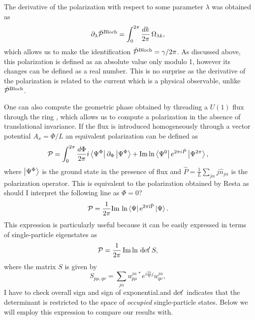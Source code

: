 \documentclass[twocolumn,amsmath,longbibliography,amssymb,superscriptaddress]{revtex4-1}
\newcommand{\carlos}[1]{{\color{red} #1}}
\newcommand{\maria}[1]{{\color{blue} #1}}
\begin{document}
The derivative of the polarization with respect to some parameter $\lambda$ was obtained \cite{KingSmith1993} as
\begin{equation}\label{eq:Bloch_polarization}
\partial_\lambda \tilde{\mathcal{P}}^{\rm Bloch} = \int_{0}^{2\pi} \frac{dk}{2\pi} \, \Omega_{\lambda k},
\end{equation}
which allows us to make the identification $ \tilde{\mathcal{P}}^{\rm Bloch} = \gamma/2\pi$. As discussed above,  this polarization is defined as an absolute value only modulo 1, however its changes can be defined as a real number. This is no surprise as the derivative of the polarization is related to the current which is a physical observable, unlike $\tilde{\mathcal{P}}^{\rm Bloch}$. 

One can also compute the geometric phase obtained by threading a $U(1)$ flux through the ring \cite{Watanabe2018}, which allows us to compute a polarization in the absence of translational invariance. If the flux is introduced homogeneously through a vector potential $A_x = \Phi/L$ an equivalent polarization can be defined as
\begin{equation}
\mathcal{P} = \int_0^{2\pi}\frac{d\Phi}{2\pi} i\bra{\Psi^\Phi}\partial_\Phi \ket{\Psi^\Phi} + \Im\ln \bra{\Psi^0}e^{2\pi i \hat{P}} \ket{\Psi^{2\pi}}, 
\end{equation}
where $\ket{\Psi^{\Phi}}$ is the ground state in the presence of flux and $\hat{P}=\frac{1}{L}\sum_{j\alpha} j\hat{n}_{j\alpha}$ is the polarization operator. This is equivalent to the polarization obtained by Resta \cite{Resta1997} as
\maria{should I interpret the following line as $\Phi=0$?}
\begin{align}
\mathcal{P} = \frac{1}{2\pi} \rm{ Im }\,\ln\bra{\Psi}e^{2\pi i \hat{P}}\ket{\Psi}.
\end{align}
This expression is particularly useful because it can be easily expressed in terms of single-particle eigenstates as
\begin{align}
\mathcal{P} = \frac{1}{2\pi}\Im \ln \, {\rm det }\!' \, S,
\label{eq:polarization_resta}
\end{align}
where the matrix $S$ is given by
\begin{equation}
S_{p\mu,q\nu} = \sum_{j\alpha} u_{p\mu}^{j \alpha \, \ast} e^{i\frac{2\pi}{L}j}u_{q\nu}^{j \alpha},
\end{equation}
\carlos{I have to check overall sign and sign of exponential.}and  ${\rm det }\!' $ indicates that the determinant is restricted to the space of \emph{occupied} single-particle states. Below we will employ this expression to compare our results with.
\end{document}
